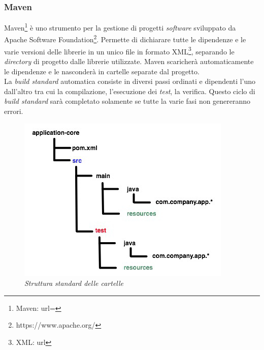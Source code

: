\subsubsection{Maven}
Maven\footnote{Maven: url= } è uno strumento per la gestione di progetti \textit{software} sviluppato da Apache Software Foundation\footnote{https://www.apache.org/}. Permette di dichiarare tutte le dipendenze e le varie versioni delle librerie in un unico file in formato XML\footnote{XML: url}, separando le \textit{directory} di progetto dalle librerie utilizzate. Maven scaricherà automaticamente le dipendenze e le nasconderà in cartelle separate dal progetto.\\
La \textit{build standard} automatica consiste in diversi passi ordinati e dipendenti l'uno dall'altro tra cui la compilazione, l'esecuzione dei \textit{test}, la verifica. Questo ciclo di \textit{build standard} sarà completato solamente se tutte la varie fasi non genereranno errori.
\begin{figure}[h!]
	\centering
	\includegraphics[scale=0.5]{immagini/maven.jpg}
	\caption{\textit{Struttura standard delle cartelle} }
\end{figure}

